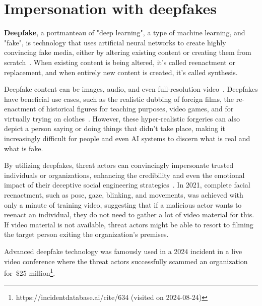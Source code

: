 \section{Impersonation with deepfakes}
\begin{comment}
\end{comment}

%
%
\textbf{Deepfake}, a portmanteau of "deep learning", a type of machine learning, and "fake", is technology that uses artificial neural networks to create highly convincing fake media, either by altering existing content or creating them from scratch~\citep{mirsky_Creation_Detection_Deepfakes_2021}. When existing content is being altered, it's called reenactment or replacement, and when entirely new content is created, it's called synthesis.

%
%
Deepfake content can be images, audio, and even full-resolution video~\citep{blauth_AI_Crime_Overview_Malicious_Use_Abuse_2022}. Deepfakes have beneficial use cases, such as the realistic dubbing of foreign films, the re-enactment of historical figures for teaching purposes, video games, and for virtually trying on clothes~\citep{mirsky_Creation_Detection_Deepfakes_2021}. However, these hyper-realistic forgeries can also depict a person saying or doing things that didn't take place, making it increasingly difficult for people and even AI systems to discern what is real and what is fake. 

%
%
By utilizing deepfakes, threat actors can convincingly impersonate trusted individuals or organizations, enhancing the credibility and even the emotional impact of their deceptive social engineering strategies~\citep{mirsky_Creation_Detection_Deepfakes_2021}. In 2021, complete facial reenactment, such as pose, gaze, blinking, and movements, was achieved with only a minute of training video, suggesting that if a malicious actor wants to reenact an individual, they do not need to gather a lot of video material for this. If video material is not available, threat actors might be able to resort to filming the target person exiting the organization's premises. 

Advanced deepfake technology was famously used in a 2024 incident in a live video conference where the threat actors successfully scammed an organization for~\$25 million\footnote{https://incidentdatabase.ai/cite/634 (visited on 2024-08-24)}.%




